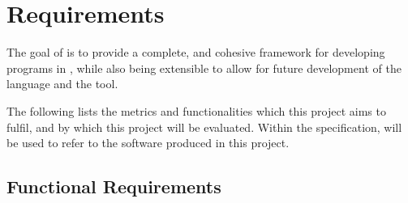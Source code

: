 \chapter{Requirements}

The goal of \rimp is to provide a complete, and cohesive framework for developing programs in \rimplang, while also being extensible to allow for future development of the language and the tool.

The following lists the metrics and functionalities which this project aims to fulfil, and by which this project will be evaluated.
Within the specification, \rimp will be used to refer to the software produced in this project.

\section{Functional Requirements}

